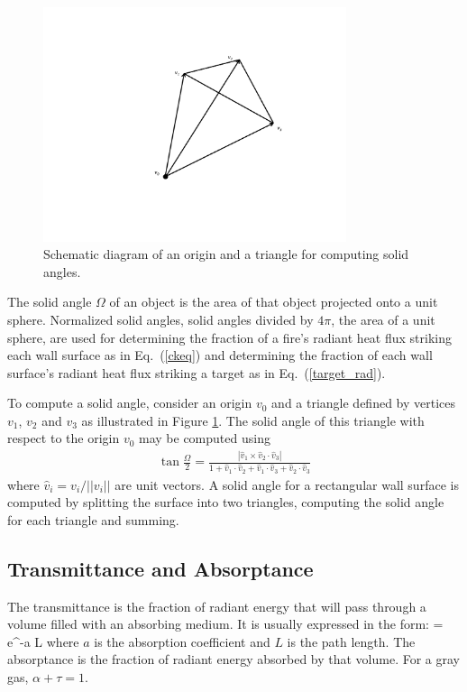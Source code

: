 \documentclass[12pt]{book}
\begin{document}
\begin{figure}[!ht]
\label{solidanglesetup}
\centering
\includegraphics[width=3.5in]{FIGURES/solidanglesetup}
\caption{Schematic diagram of an origin and a triangle for computing solid angles.}
\end{figure}

The solid angle $\Omega$ of an object is the area of that object projected onto a unit sphere. Normalized solid angles, solid angles divided by $4\pi$, the area of a unit sphere, are used for determining the fraction of a fire's radiant heat flux striking each wall surface as in Eq.~(\ref{ckeq}) and determining the fraction of each wall surface's radiant heat flux striking a target as in Eq.~(\ref{target_rad}).

To compute a solid angle, consider an origin $v_0$ and a triangle defined by vertices $v_1$, $v_2$ and $v_3$ as illustrated in Figure \ref{solidanglesetup}.  The solid angle of this triangle with respect to the origin $v_0$ may be computed using
\begin{eqnarray*}
\tan\frac{\Omega}{2} = \frac{|\hat{v}_1\times \hat{v}_2\cdot \hat{v}_3|}{1+\hat{v}_1\cdot \hat{v}_2+\hat{v}_1\cdot \hat{v}_3+\hat{v}_2\cdot \hat{v}_3}
\end{eqnarray*}
where $\hat{v}_i=v_i/||v_i||$ are unit vectors\cite{vanOosterom:1983}. A solid angle for a rectangular wall surface is computed by splitting the surface into two triangles, computing the solid angle for each triangle and summing.

\subsection{Transmittance and Absorptance}

The transmittance is the fraction of radiant energy that will pass through a volume filled with an absorbing medium. It is usually expressed in the form:
\be
   \tau = {\rm e}^{-a L}
\ee
where $a$ is the absorption coefficient and $L$ is the path length. The absorptance is the fraction of radiant energy absorbed by that volume. For a gray gas, $\alpha + \tau = 1$.
\end{document}
